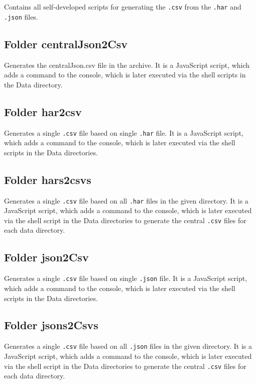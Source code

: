 Contains all self-developed scripts for generating the \texttt{.csv} from the \texttt{.har} and \texttt{.json} files.

\subsection{Folder centralJson2Csv}

Generates the centralJson.csv file in the archive. It is a JavaScript script, which adds a command to the console, which is later executed via the shell scripts in the Data directory.

\subsection{Folder har2csv}

Generates a single \texttt{.csv} file based on single \texttt{.har} file. It is a JavaScript script, which adds a command to the console, which is later executed via the shell scripts in the Data directories.

\subsection{Folder hars2csvs}

Generates a single \texttt{.csv} file based on all \texttt{.har} files in the given directory. It is a JavaScript script, which adds a command to the console, which is later executed via the shell script in the Data directories to generate the central \texttt{.csv} files for each data directory.

\subsection{Folder json2Csv}

Generates a single \texttt{.csv} file based on single \texttt{.json} file. It is a JavaScript script, which adds a command to the console, which is later executed via the shell scripts in the Data directories.

\subsection{Folder jsons2Csvs}

Generates a single \texttt{.csv} file based on all \texttt{.json} files in the given directory. It is a JavaScript script, which adds a command to the console, which is later executed via the shell script in the Data directories to generate the central \texttt{.csv} files for each data directory.

